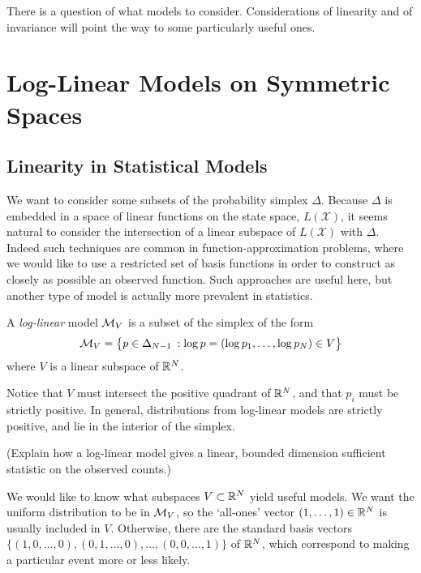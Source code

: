 \documentclass[cclicense]{hmcthesis}
\newcommand*{\xs}{\mathcal X}
\numberwithin{equation}{chapter}
\numberwithin{thmcounter}{chapter}
\begin{document}
    There is a question of what models to consider.  Considerations of linearity
    and of invariance will point the way to some particularly useful ones.

\chapter{Log-Linear Models on Symmetric Spaces}

\section{Linearity in Statistical Models}

    We want to consider some subsets of the probability simplex $\Delta$.
    Because $\Delta$ is embedded in a space of linear functions on the state
    space, $L(\xs)$, it seems natural to consider the intersection of a linear
    subspace of $L(\xs)$ with $\Delta$.  Indeed such techniques are common in
    function-approximation problems, where we would like to use a restricted set
    of basis functions in order to construct as closely as possible an observed
    function.  Such approaches are useful here, but another type of model is
    actually more prevalent in statistics.

    \begin{definition}
        A \emph{log-linear} model $\ms_V$ is a subset of the simplex of the form
        \[
            \ms_V = \cdel[\big]{p \in \Delta_{N-1} \:: \log p = (\log p_1, \ldots,
            \log p_N) \in V}
        \]
        where $V$ is a linear subspace of $\R^N$.
    \end{definition}

    Notice that $V$ must intersect the positive quadrant of $\R^N$, and that
    $p_i$ must be strictly positive.  In general, distributions from log-linear
    models are strictly positive, and lie in the interior of the simplex.

    (Explain how a log-linear model gives a linear, bounded dimension sufficient
    statistic on the observed counts.)

    We would like to know what subspaces $V \subset \R^N$ yield useful models.
    We want the uniform distribution to be in $\ms_V$, so the `all-ones' vector
    $(1, \ldots, 1) \in \R^N$ is usually included in $V$.  Otherwise, there are
    the standard basis vectors $\{(1, 0, \ldots, 0), (0, 1, \ldots, 0), \ldots,
    (0, 0, \ldots, 1)\}$ of $\R^N$, which correspond to making a particular
    event more or less likely.  
    
\end{document}
